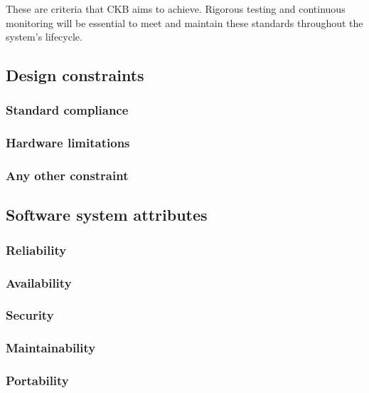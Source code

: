These are criteria that CKB aims to achieve. Rigorous testing and continuous monitoring will be essential to meet and maintain these standards throughout the system’s lifecycle.

\subsection{Design constraints}
\subsubsection{Standard compliance}
\subsubsection{Hardware limitations}
\subsubsection{Any other constraint}

\subsection{Software system attributes}
\subsubsection{Reliability}
\subsubsection{Availability}
\subsubsection{Security}
\subsubsection{Maintainability}
\subsubsection{Portability}